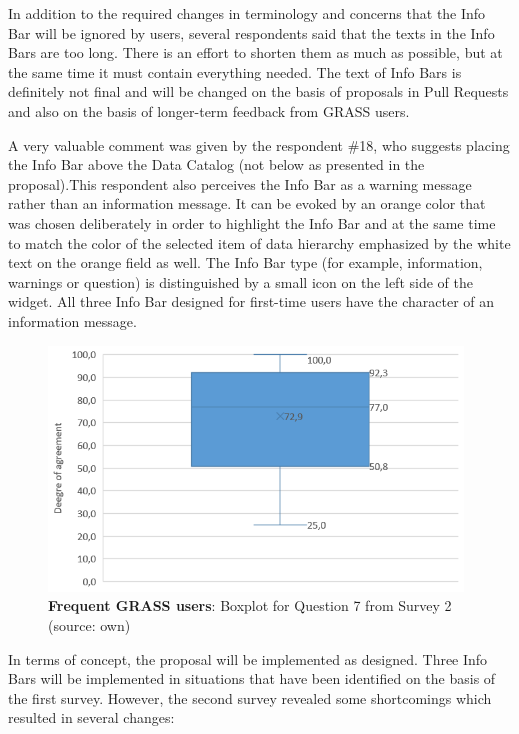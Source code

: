 \documentclass[a4paper,10pt,twoside]{article}
\begin{document}
\noindent In addition to the required changes in terminology and concerns that the Info Bar will be ignored by users, several respondents said that the texts in the Info Bars are too long. There is an effort to shorten them as much as possible, but at the same time it must contain everything needed. The text of Info Bars is definitely not final and will be changed on the basis of proposals in Pull Requests and also on the basis of longer-term feedback from GRASS users.

A very valuable comment was given by the respondent \#18, who suggests placing the Info Bar above the Data Catalog (not below as presented in the proposal).This respondent also perceives the Info Bar as a warning message rather than an information message. It can be evoked by an orange color that was chosen deliberately in order to highlight the Info Bar and at the same time to match the color of the selected item of data hierarchy emphasized by the white text on the orange field as well. The Info Bar type (for example, information, warnings or question) is distinguished by a small icon on the left side of the widget. All three Info Bar designed for first-time users have the character of an information message.

\vspace{0.3cm}
\begin{figure}[hbt!] 
\begin{center}
\includegraphics[width=11cm]{../surveys/analyzed_data/survey2_question7_boxplot_group2.png} 
\caption[\textbf{Frequent GRASS users}: Boxplot for Question 7 from Survey 2]{\textbf{Frequent GRASS users}: Boxplot for Question 7 from Survey 2 (source: own)}
\label{fig:survey2_question7_boxplot_group2}
\end{center}
\end{figure}

\noindent In terms of concept, the proposal will be implemented as designed. Three Info Bars will be implemented in situations that have been identified on the basis of the first survey. However, the second survey revealed some shortcomings which resulted in several changes:
\end{document}
